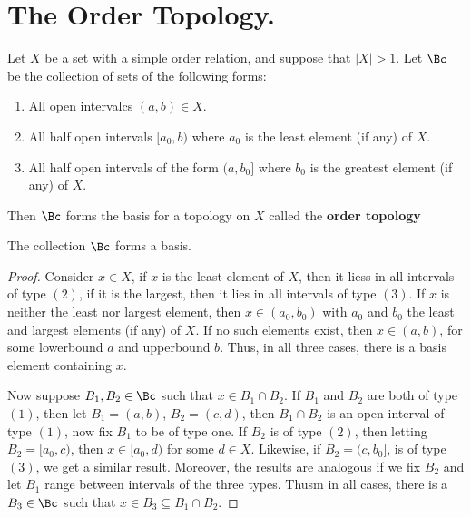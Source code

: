 
\section{The Order Topology.}

\begin{definition}
    Let $X$ be a set with a simple order relation, and suppose that  $|X|>1$. Let $\Bc$ 
    be the collection of sets of the following forms:
        \begin{enumerate}[label=(\arabic*)]
            \item All open intervalcs $(a,b) \in X$.
                
            \item All half open intervals $[a_0,b)$ where $a_0$ is the least element 
                (if any) of $X$.

            \item All half open intervals of the form  $(a,b_0]$ where $b_0$ is the greatest 
                element (if any) of $X$.
        \end{enumerate}
    Then $\Bc$ forms the basis for a topology on  $X$ called the \textbf{order topology}
\end{definition}

\begin{theorem}\label{1.3.1}
    The collection $\Bc$ forms a basis.
\end{theorem}
\begin{proof}
    Consider $x \in X$, if  $x$ is the least element of  $X$, then it liess in all 
    intervals of type $(2)$, if it is the largest, then it lies in all intervals of type 
    $(3)$. If $x$ is neither the least nor largest element, then $x \in (a_0,b_0)$ with 
    $a_0$ and $b_0$ the least and largest elements (if any) of $X$. If no such elements 
    exist, then $x \in (a,b)$, for some lowerbound $a$ and upperbound $b$. Thus, in all three 
    cases, there is a basis element containing  $x$. 

    Now suppose $B_1,B_2 \in \Bc$ such that $x \in B_1 \cap B_2$. If $B_1$ and $B_2$ are 
    both of type $(1)$, then let  $B_1=(a,b)$, $B_2=(c,d)$, then $B_1 \cap B_2$ is an 
    open interval of type $(1)$, now fix  $B_1$ to be of type one. If $B_2$ is of type $(2)$, then 
    letting  $B_2=[a_0,c)$, then $x \in [a_0,d)$ for some $d \in X$. Likewise, if  $B_2=(c,b_0]$, 
    is of type $(3)$, we get a similar result. Moreover, the results are analogous if we 
    fix  $B_2$ and let $B_1$ range between intervals of the three types. Thusm in all cases, there 
    is a $B_3 \in \Bc$ such that $x \in B_3 \subseteq B_1 \cap B_2$.
\end{proof}

